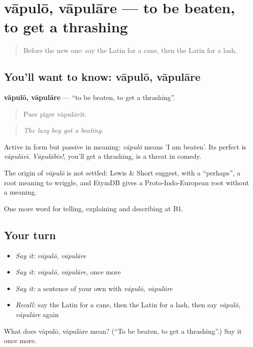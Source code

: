 \section[vāpulō, vāpulāre]{vāpulō, vāpulāre — to be beaten, to get a thrashing}

\label{lesson:LA-C408-vapulo}



\begin{quote}
Before the new one: say the Latin for a cane, then the Latin for a lash.
\end{quote}

\subsection*{You'll want to know: vāpulō, vāpulāre}
\textbf{vāpulō, vāpulāre} — \textquotedblleft{}to be beaten, to get a thrashing\textquotedblright{}.

\begin{quote}
Puer piger vāpulāvit.
\end{quote}

\begin{quote}
\emph{The lazy boy got a beating.}
\end{quote}

Active in form but passive in meaning: \emph{vāpulō} means 'I am beaten'. Its perfect is \emph{vāpulāvī}. \emph{Vāpulābis!}, you'll get a thrashing, is a threat in comedy.

\begin{cousinweb}
The origin of \emph{vāpulō} is not settled: Lewis \& Short suggest, with a \textquotedblleft{}perhaps\textquotedblright{}, a root meaning to wriggle, and EtymDB gives a Proto-Indo-European root without a meaning.
\end{cousinweb}

\begin{grammarlens}[title={What you've built}]
One more word for telling, explaining and describing at B1.
\end{grammarlens}

\subsection*{Your turn}
\begin{itemize}
\raggedright
  \item \emph{Say it:} \emph{vāpulō, vāpulāre}
  \item \emph{Say it:} \emph{vāpulō, vāpulāre}, once more
  \item \emph{Say it:} a sentence of your own with \emph{vāpulō, vāpulāre}
  \item \emph{Recall:} say the Latin for a cane, then the Latin for a lash, then say \emph{vāpulō, vāpulāre} again
\end{itemize}

\begin{tcolorbox}[breakable,colback=teal!4,colframe=teal!35!black,title={Before you move on}]
What does vāpulō, vāpulāre mean? (\textquotedblleft{}To be beaten, to get a thrashing\textquotedblright{}.) Say it once more.
\end{tcolorbox}
